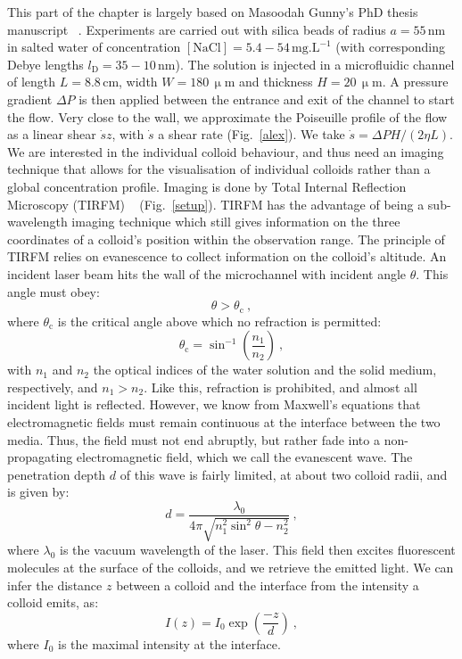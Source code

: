 This part of the chapter is largely based on Masoodah Gunny's PhD thesis manuscript ~\cite{gunny_near-surface_2025}. Experiments are carried out with silica beads of radius $a=55 \, \mathrm{nm}$ in salted water of concentration $[\mathrm{NaCl}] = 5.4-54\, \mathrm{mg.L}^{-1}$ (with corresponding Debye lengths $l_\mathrm{D} = 35-10 \, \mathrm{nm}$). The solution is injected in a microfluidic channel of length $L = 8.8\,\mathrm{cm}$, width $W = 180\,  \upmu \mathrm{ m}$ and thickness $H = 20 \, \upmu  \mathrm{m}$. A pressure gradient $\Delta P$ is then applied between the entrance and exit of the channel to start the flow. Very close to the wall, we approximate the Poiseuille profile of the flow as a linear shear $\dot s z$, with $\dot s$ a shear rate (Fig.~\ref{alex}). We take $\dot s = \Delta PH/(2\eta L)$. We are interested in the individual colloid behaviour, and thus need an imaging technique that allows for the visualisation of individual colloids rather than a global concentration profile.
Imaging is done by Total Internal Reflection Microscopy (TIRFM) ~\cite{fish_tirf_2009} (Fig.~\ref{setup}). TIRFM has the advantage of being a sub-wavelength imaging technique which still gives information on the three coordinates of a colloid's position within the observation range. The principle of TIRFM relies on evanescence to collect information on the colloid's altitude. An incident laser beam hits the wall of the microchannel with incident angle $\theta$. This angle must obey:
\begin{equation}
    \theta > \theta_\mathrm{c}~,
\end{equation}
where $\theta_\mathrm{c}$ is the critical angle above which no refraction is permitted:
\begin{equation}
    \theta_\mathrm{c} = \sin^{-1}\left(\dfrac{n_1}{n_2}\right)~,
\end{equation}
with $n_1$ and $n_2$ the optical indices of the water solution and the solid medium, respectively, and $n_1>n_2$. Like this, refraction is prohibited, and almost all incident light is reflected. However, we know from Maxwell's equations that electromagnetic fields must remain continuous at the interface between the two media. Thus, the field must not end abruptly, but rather fade into a non-propagating electromagnetic field, which we call the evanescent wave. The penetration depth $d$ of this wave is fairly limited, at about two colloid radii, and is given by:
\begin{equation}
    d = \dfrac{\lambda_0}{4 \pi \sqrt{n_1^2 \sin^2\theta - n_2^2}}~,
\end{equation}
where $\lambda_0$ is the vacuum wavelength of the laser. This field then excites fluorescent molecules at the surface of the colloids, and we retrieve the emitted light. We can infer the distance $z$ between a colloid and the interface from the intensity a colloid emits, as:
\begin{equation}
    I(z) = I_0 \exp \left(\dfrac{-z}{d}\right)~,
\end{equation}
where $I_0$ is the maximal intensity at the interface.


